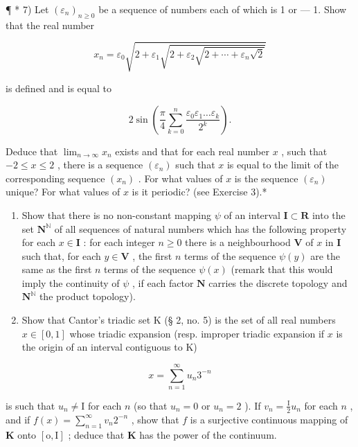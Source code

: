 ¶ * 7) Let \((\varepsilon_n)_{n \geqslant 0}\) be a sequence of numbers each of which is 1 or --- 1. Show that the real number

\[
x _ {n} = \varepsilon_ {0} \sqrt {2 + \varepsilon_ {1} \sqrt {2 + \varepsilon_ {2} \sqrt {2 + \cdots + \varepsilon_ {n} \sqrt {2}}}}
\]

is defined and is equal to

\[
2 \sin \left(\frac {\pi}{4} \sum_ {k = 0} ^ {n} \frac {\varepsilon_ {0} \varepsilon_ {1} \dots \varepsilon_ {k}}{2 ^ {k}}\right).
\]

Deduce that \(\lim_{n\to \infty}x_n\) exists and that for each real number \(x\) , such that \(-2\leqslant x\leqslant 2\) , there is a sequence \((\varepsilon_n)\) such that \(x\) is equal to the limit of the corresponding sequence \((x_{n})\) . For what values of \(x\) is the sequence \((\varepsilon_n)\) unique? For what values of \(x\) is it periodic? (see Exercise 3).*

\begin{enumerate}
\def\labelenumi{\arabic{enumi})}
\setcounter{enumi}{7}
\item
  Show that there is no non-constant mapping \(\psi\) of an interval \(\mathbf{I} \subset \mathbf{R}\) into the set \(\mathbf{N}^{\mathbb{N}}\) of all sequences of natural numbers which has the following property for each \(x \in \mathbf{I}\) : for each integer \(n \geqslant 0\) there is a neighbourhood \(\mathbf{V}\) of \(x\) in \(\mathbf{I}\) such that, for each \(y \in \mathbf{V}\) , the first \(n\) terms of the sequence \(\psi(y)\) are the same as the first \(n\) terms of the sequence \(\psi(x)\) (remark that this would imply the continuity of \(\psi\) , if each factor \(\mathbf{N}\) carries the discrete topology and \(\mathbf{N}^{\mathbb{N}}\) the product topology).
\item
  Show that Cantor's triadic set K (§ 2, no. 5) is the set of all real numbers \(x \in [0, 1]\) whose triadic expansion (resp. improper triadic expansion if \(x\) is the origin of an interval contiguous to K)
\end{enumerate}

\[
x = \sum_ {n = 1} ^ {\infty} u _ {n} 3 ^ {- n}
\]

is such that \(u_{n} \neq \mathrm{I}\) for each \(n\) (so that \(u_{n} = 0\) or \(u_{n} = 2\) ). If \(v_{n} = \frac{\mathrm{I}}{2} u_{n}\) for each \(n\) , and if \(f(x) = \sum_{n=1}^{\infty} v_{n} 2^{-n}\) , show that \(f\) is a surjective continuous mapping of \(\mathbf{K}\) onto \([\mathrm{o}, \mathrm{I}]\) ; deduce that \(\mathbf{K}\) has the power of the continuum.

